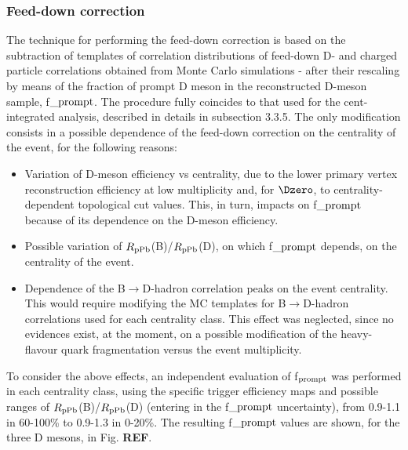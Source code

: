 \subsubsection{Feed-down correction}
The technique for performing the feed-down correction is based on the subtraction of templates of correlation distributions of feed-down D- and charged particle correlations obtained from Monte Carlo simulations - after their rescaling by means of the fraction of prompt D meson in the reconstructed D-meson sample, f$\_{\rm prompt}$.
The procedure fully coincides to that used for the cent-integrated analysis, described in details in subsection 3.3.5.
The only modification consists in a possible dependence of the feed-down correction on the centrality of the event, for the following reasons:
\begin{itemize}
  \item Variation of D-meson efficiency vs centrality, due to the lower primary vertex reconstruction efficiency at low multiplicity and, for $\Dzero$, to centrality-dependent topological cut values. This, in turn, impacts on f$\_{\rm prompt}$ because of its dependence on the D-meson efficiency.
  \item Possible variation of $R_{\rm pPb}$(B)/$R_{\rm pPb}$(D), on which f$\_{\rm prompt}$ depends, on the centrality of the event.
  \item Dependence of the B$\rightarrow$D-hadron correlation peaks on the event centrality. This would require modifying the MC templates for B$\rightarrow$D-hadron correlations used for each centrality class. This effect was neglected, since no evidences exist, at the moment, on a possible modification of the heavy-flavour quark fragmentation versus the event multiplicity.
\end{itemize}
To consider the above effects, an independent evaluation of f$_{\rm prompt}$ was performed in each centrality class, using the specific trigger efficiency maps and possible ranges of $R_{\rm pPb}$(B)/$R_{\rm pPb}$(D) (entering in the f$\_{\rm prompt}$ uncertainty), from 0.9-1.1 in 60-100\% to 0.9-1.3 in 0-20\%.
The resulting f$\_{\rm prompt}$ values are shown, for the three D mesons, in Fig. {\bf REF}.


